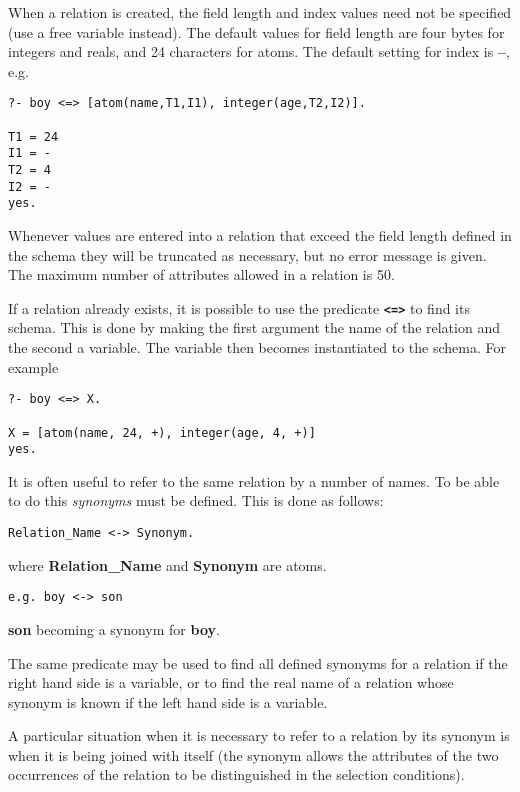 When a relation is created, the field length and index
values need not be specified (use a free variable instead).
The default values for field length
are four bytes for integers and reals, and 24 characters for atoms.
The default setting for index is {\bf --}, e.g.
\begin{verbatim}
?- boy <=> [atom(name,T1,I1), integer(age,T2,I2)].

T1 = 24
I1 = -
T2 = 4
I2 = -
yes.
\end{verbatim}

Whenever values are entered into a relation that exceed
the field length defined in the schema they will be
truncated as necessary, but no error message is given.
The maximum number of attributes allowed in a relation is 50.


If a relation already exists, it is possible to use the predicate 
{\bf \verb-<=>-} to find its schema. 
This is done by making the first argument the name of the relation
and the second a variable. The variable then becomes instantiated to
the schema. For example

\begin{verbatim}
?- boy <=> X.

X = [atom(name, 24, +), integer(age, 4, +)]
yes.
\end{verbatim}

It is often useful to refer to the same relation by a number of names.
To be able to do this {\em synonyms} must be defined. This is
done as follows: 
\begin{verbatim}
Relation_Name <-> Synonym.
\end{verbatim}
where {\bf Relation\_Name} and {\bf Synonym} are atoms.
\label{syn}
\begin{verbatim}
e.g. boy <-> son
\end{verbatim}

{\bf son} becoming a synonym for {\bf boy}.


The same predicate may be 
used to find all defined synonyms for a relation if the right
hand side is a variable, or to find the real name of a relation
whose synonym is known if the left hand side is a variable.

A particular situation when it is necessary to refer to a 
relation by its synonym is when it is being joined with itself
(the synonym allows the attributes of the two occurrences of the 
relation to be distinguished in the selection conditions).

